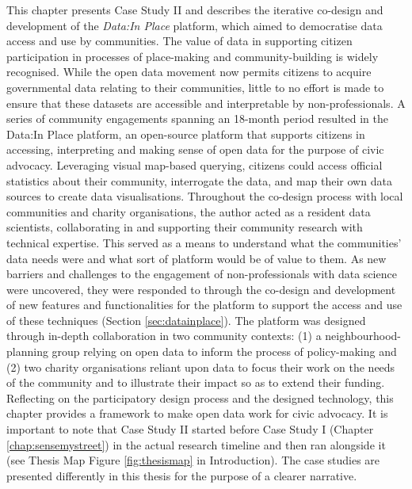 This chapter presents Case Study II and describes the iterative co-design and development of the \textit{Data:In Place} platform, which aimed to democratise data access and use by communities. The value of data in supporting citizen participation in processes of place-making and community-building is widely recognised. While the open data movement now permits citizens to acquire governmental data relating to their communities, little to no effort is made to ensure that these datasets are accessible and interpretable by non-professionals. A series of community engagements spanning an 18-month period resulted in the Data:In Place platform, an open-source platform that supports citizens in accessing, interpreting and making sense of open data for the purpose of civic advocacy. Leveraging visual map-based querying, citizens could access official statistics about their community, interrogate the data, and map their own data sources to create data visualisations. Throughout the co-design process with local communities and charity organisations, the author acted as a resident data scientists, collaborating in and supporting their community research with technical expertise. This served as a means to understand what the communities' data needs were and what sort of platform would be of value to them. As new barriers and challenges to the engagement of non-professionals with data science were uncovered, they were responded to through the co-design and development of new features and functionalities for the platform to support the access and use of these techniques (Section \ref{sec:datainplace}). The platform was designed through in-depth collaboration in two community contexts: (1) a neighbourhood-planning group relying on open data to inform the process of policy-making and (2) two charity organisations reliant upon data to focus their work on the needs of the community and to illustrate their impact so as to extend their funding. Reflecting on the participatory design process and the designed technology, this chapter provides a framework to make open data work for civic advocacy. It is important to note that Case Study II started before Case Study I (Chapter \ref{chap:sensemystreet}) in the actual research timeline and then ran alongside it (see Thesis Map Figure \ref{fig:thesismap} in Introduction). The case studies are presented differently in this thesis for the purpose of a clearer narrative.
\clearpage

